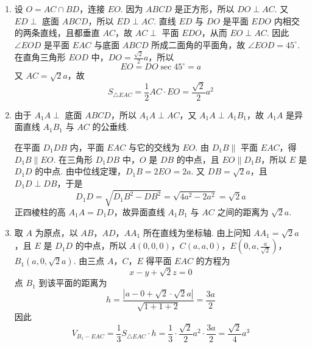 \begin{solution}
\begin{enumerate}
\item 设 \(O=AC\cap BD\)，连接 \(EO\). 因为 \(ABCD\) 是正方形，所以 \(DO\perp AC\). 又 \(ED\perp\) 底面 \(ABCD\)，所以 \(ED\perp AC\). 直线 \(ED\) 与 \(DO\) 是平面 \(EDO\) 内相交的两条直线，且都垂直 \(AC\)，故 \(AC\perp\) 平面 \(EDO\)，从而 \(EO\perp AC\). 因此 \(\angle EOD\) 是平面 \(EAC\) 与底面 \(ABCD\) 所成二面角的平面角，故 \(\angle EOD=45^\circ\). 在直角三角形 \(EOD\) 中，\(DO=\frac{\sqrt2}{2}a\)，所以
\[
EO=DO\sec45^\circ=a
\]
又 \(AC=\sqrt2a\)，故
\[
S_{\triangle EAC}=\frac12AC\cdot EO=\frac{\sqrt2}{2}a^2
\]

\item 由于 \(A_1A\perp\) 底面 \(ABCD\)，所以 \(A_1A\perp AC\)，又 \(A_1A\perp A_1B_1\)，故 \(A_1A\) 是异面直线 \(A_1B_1\) 与 \(AC\) 的公垂线.

在平面 \(D_1DB\) 内，平面 \(EAC\) 与它的交线为 \(EO\). 由 \(D_1B\parallel\) 平面 \(EAC\)，得 \(D_1B\parallel EO\). 在三角形 \(D_1DB\) 中，\(O\) 是 \(DB\) 的中点，且 \(EO\parallel D_1B\)，所以 \(E\) 是 \(D_1D\) 的中点. 由中位线定理，\(D_1B=2EO=2a\). 又 \(DB=\sqrt2a\)，且 \(D_1D\perp DB\)，于是
\[
D_1D=\sqrt{D_1B^2-DB^2}=\sqrt{4a^2-2a^2}=\sqrt2a
\]
正四棱柱的高 \(A_1A=D_1D\)，故异面直线 \(A_1B_1\) 与 \(AC\) 之间的距离为 \(\sqrt2a\).

\item 取 \(A\) 为原点，以 \(AB\)，\(AD\)，\(AA_1\) 所在直线为坐标轴. 由上问知 \(AA_1=\sqrt2a\)，且 \(E\) 是 \(D_1D\) 的中点，所以
\(A(0,0,0)\)，\(C(a,a,0)\)，\(E\left(0,a,\frac{a}{\sqrt2}\right)\)，\(B_1(a,0,\sqrt2a)\).
由三点 \(A\)，\(C\)，\(E\) 得平面 \(EAC\) 的方程为
\[
x-y+\sqrt2z=0
\]
点 \(B_1\) 到该平面的距离为
\[
h=\frac{\left|a-0+\sqrt2\cdot\sqrt2a\right|}{\sqrt{1+1+2}}=\frac{3a}{2}
\]
因此
\[
V_{B_1-EAC}=\frac13S_{\triangle EAC}\cdot h
=\frac13\cdot\frac{\sqrt2}{2}a^2\cdot\frac{3a}{2}=\frac{\sqrt2}{4}a^3
\]
\end{enumerate}
\end{solution}

